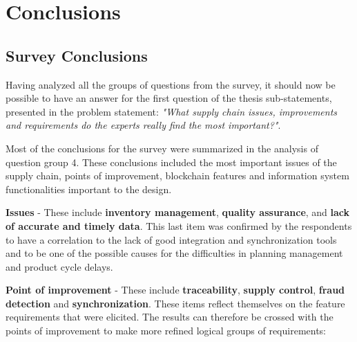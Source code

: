 
\section{Conclusions}

\subsection{Survey Conclusions}

Having analyzed all the groups of questions from the survey, it should now be possible to have an answer for the first question of the thesis sub-statements, presented in the problem statement: \textit{"What supply chain issues, improvements and requirements do the experts really find the most important?"}.

Most of the conclusions for the survey were summarized in the analysis of question group 4. These conclusions included the most important issues of the supply chain, points of improvement, blockchain features and information system functionalities important to the design.


\par \textbf{Issues} - These include \textbf{inventory management}, \textbf{quality assurance}, \textbf{} and \textbf{lack of accurate and timely data}. This last item was confirmed by the respondents to have a correlation to the lack of good integration and synchronization tools and to be one of the possible causes for the difficulties in planning management and product cycle delays.

\par \textbf{Point of improvement} - These include \textbf{traceability}, \textbf{supply control}, \textbf{fraud detection} and \textbf{synchronization}. These items reflect themselves on the feature requirements that were elicited. The results can therefore be crossed with the points of improvement to make more refined logical groups of requirements:

